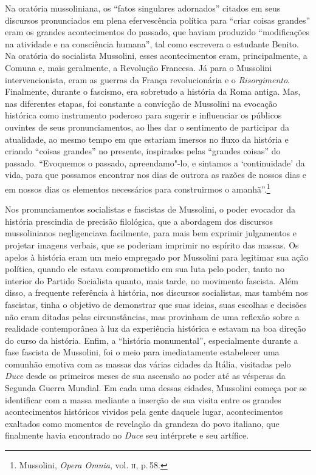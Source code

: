 Na oratória mussoliniana, os ``fatos singulares adornados'' citados em
seus discursos pronunciados em plena efervescência política para ``criar
coisas grandes'' eram os grandes acontecimentos do passado, que haviam
produzido ``modificações na atividade e na consciência humana'', tal
como escrevera o estudante Benito. Na oratória do socialista Mussolini,
esses acontecimentos eram, principalmente, a Comuna e, mais geralmente,
a Revolução Francesa. Já para o Mussolini intervencionista, eram as
guerras da França revolucionária e o \emph{Risorgimento}. Finalmente,
durante o fascismo, era sobretudo a história da Roma antiga. Mas, nas
diferentes etapas, foi constante a convicção de Mussolini na evocação
histórica como instrumento poderoso para sugerir e influenciar os
públicos ouvintes de seus pronunciamentos, ao lhes dar o sentimento de
participar da atualidade, ao mesmo tempo em que estariam imersos no
fluxo da história e criando ``coisas grandes'' no presente, inspirados
pelas ``grandes coisas'' do passado. ``Evoquemos o passado,
apreendamo"-lo, e sintamos a `continuidade' da vida, para que possamos
encontrar nos dias de outrora as razões de nossos dias e em nossos dias
os elementos necessários para construirmos o amanhã''.\footnote{Mussolini,
  \emph{Opera Omnia}, vol. \textsc{ii}, p.\,58.}

Nos pronunciamentos socialistas e fascistas de Mussolini, o poder
evocador da história prescindia de precisão filológica, que a abordagem
dos discursos mussolinianos negligenciava facilmente, para mais bem
exprimir julgamentos e projetar imagens verbais, que se poderiam
imprimir no espírito das massas. Os apelos à história eram um meio
empregado por Mussolini para legitimar sua ação política, quando ele
estava comprometido em sua luta pelo poder, tanto no interior do Partido
Socialista quanto, mais tarde, no movimento fascista. Além disso, a
frequente referência à história, nos discursos socialistas, mas também
nos fascistas, tinha o objetivo de demonstrar que suas ideias, suas
escolhas e decisões não eram ditadas pelas circunstâncias, mas provinham
de uma reflexão sobre a realidade contemporânea à luz da experiência
histórica e estavam na boa direção do curso da história. Enfim, a
``história monumental'', especialmente durante a fase fascista de
Mussolini, foi o meio para imediatamente estabelecer uma comunhão
emotiva com as massas das várias cidades da Itália, visitadas pelo
\emph{Duce} desde os primeiros meses de sua ascensão ao poder até as
vésperas da Segunda Guerra Mundial. Em cada uma dessas cidades,
Mussolini começa por se identificar com a massa mediante a inserção de
sua visita entre os grandes acontecimentos históricos vividos pela gente
daquele lugar, acontecimentos exaltados como momentos de revelação da
grandeza do povo italiano, que finalmente havia encontrado no
\emph{Duce} seu intérprete e seu artífice.

